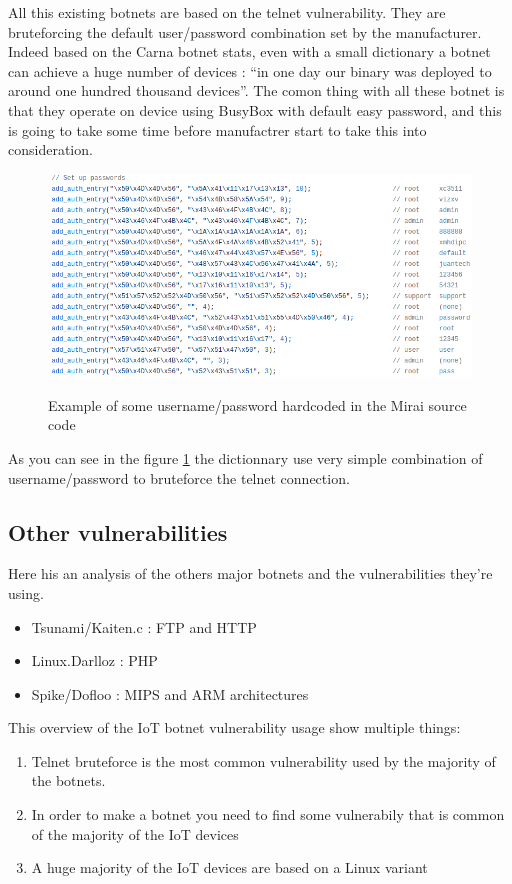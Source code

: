 \documentclass{report}
\begin{document}
All this existing botnets are based on the telnet vulnerability. They are bruteforcing the default user/password combination set by the manufacturer. Indeed based on the Carna botnet\autocite{carna} stats, even with a small dictionary a botnet can achieve a huge number of devices : ``in one day our binary was deployed to around one hundred thousand devices''.
The comon thing with all these botnet is that they operate on device using BusyBox with default easy password, and this is going to take some time before manufactrer start to take this into consideration.\newline
\begin{figure}[h]
 \caption{Example of some username/password hardcoded in the Mirai source code}
 \centering
 \includegraphics[width=1.2\textwidth]{./img/mirai-dict}
 \label{fig:mirai-dict}
\end{figure}
As you can see in the figure \ref{fig:mirai-dict} the dictionnary use very simple combination of username/password to bruteforce the telnet connection.

\subsection{Other vulnerabilities}
Here his an analysis of the others major botnets and the vulnerabilities they're using.

\begin{itemize}
 \item Tsunami/Kaiten.c\autocite{tsunami} : FTP and HTTP
 \item Linux.Darlloz\autocite{darlloz} : PHP
 \item Spike/Dofloo\autocite{spike} : MIPS and ARM architectures 
\end{itemize}

This overview of the IoT botnet vulnerability usage show multiple things:
\begin{enumerate}
 \item Telnet bruteforce is the most common vulnerability used by the majority of the botnets.
 \item In order to make a botnet you need to find some vulnerabily that is common of the majority of the IoT devices
 \item A huge majority of the IoT devices are based on a Linux variant
\end{enumerate}
\end{document}
